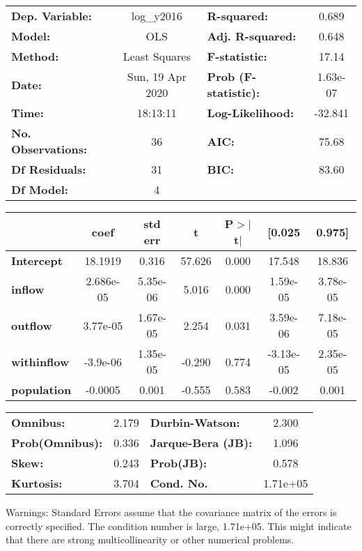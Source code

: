 \begin{center}
\begin{tabular}{lclc}
\toprule
\textbf{Dep. Variable:}    &    log\_y2016    & \textbf{  R-squared:         } &     0.689   \\
\textbf{Model:}            &       OLS        & \textbf{  Adj. R-squared:    } &     0.648   \\
\textbf{Method:}           &  Least Squares   & \textbf{  F-statistic:       } &     17.14   \\
\textbf{Date:}             & Sun, 19 Apr 2020 & \textbf{  Prob (F-statistic):} &  1.63e-07   \\
\textbf{Time:}             &     18:13:11     & \textbf{  Log-Likelihood:    } &   -32.841   \\
\textbf{No. Observations:} &          36      & \textbf{  AIC:               } &     75.68   \\
\textbf{Df Residuals:}     &          31      & \textbf{  BIC:               } &     83.60   \\
\textbf{Df Model:}         &           4      & \textbf{                     } &             \\
\bottomrule
\end{tabular}
\begin{tabular}{lcccccc}
                    & \textbf{coef} & \textbf{std err} & \textbf{t} & \textbf{P$> |$t$|$} & \textbf{[0.025} & \textbf{0.975]}  \\
\midrule
\textbf{Intercept}  &      18.1919  &        0.316     &    57.626  &         0.000        &       17.548    &       18.836     \\
\textbf{inflow}     &    2.686e-05  &     5.35e-06     &     5.016  &         0.000        &     1.59e-05    &     3.78e-05     \\
\textbf{outflow}    &     3.77e-05  &     1.67e-05     &     2.254  &         0.031        &     3.59e-06    &     7.18e-05     \\
\textbf{withinflow} &     -3.9e-06  &     1.35e-05     &    -0.290  &         0.774        &    -3.13e-05    &     2.35e-05     \\
\textbf{population} &      -0.0005  &        0.001     &    -0.555  &         0.583        &       -0.002    &        0.001     \\
\bottomrule
\end{tabular}
\begin{tabular}{lclc}
\textbf{Omnibus:}       &  2.179 & \textbf{  Durbin-Watson:     } &    2.300  \\
\textbf{Prob(Omnibus):} &  0.336 & \textbf{  Jarque-Bera (JB):  } &    1.096  \\
\textbf{Skew:}          &  0.243 & \textbf{  Prob(JB):          } &    0.578  \\
\textbf{Kurtosis:}      &  3.704 & \textbf{  Cond. No.          } & 1.71e+05  \\
\bottomrule
\end{tabular}
\end{center}

Warnings: \newline
 [1] Standard Errors assume that the covariance matrix of the errors is correctly specified. \newline
 [2] The condition number is large, 1.71e+05. This might indicate that there are \newline
 strong multicollinearity or other numerical problems.